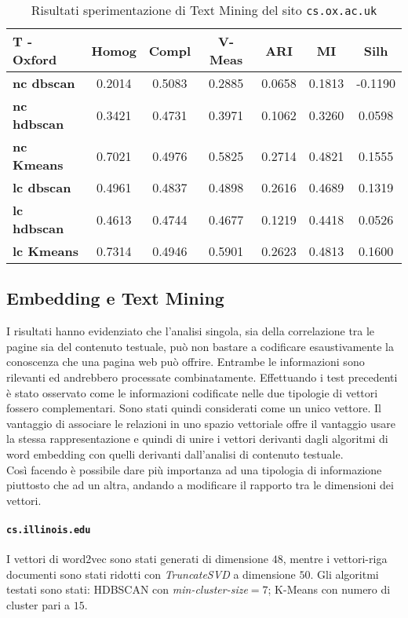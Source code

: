 \begin{table}[H]
	\begin{tabular}{| l | c | c | c | c | c | c |}
	\hline
	\textbf{T - Oxford}  & \textbf{Homog} & \textbf{Compl} & \textbf{V-Meas}  & \textbf{ARI}  & \textbf{MI}  & \textbf{Silh} \\ [3ex] \hline
	\textbf{nc dbscan} & 0.2014 & 0.5083 & 0.2885 & 0.0658 & 0.1813 & -0.1190 \\ [3ex]
	 \hline 
	\textbf{nc hdbscan} & 0.3421 & 0.4731 & 0.3971 & 0.1062 & 0.3260 & 0.0598 \\ [3ex]
	 \hline
	\textbf{nc Kmeans} & 0.7021 & 0.4976 & 0.5825 & 0.2714 & 0.4821 & 0.1555 \\ [3ex]
	 \hline	
	\textbf{lc dbscan} & 0.4961 & 0.4837 & 0.4898 & 0.2616 & 0.4689 & 0.1319 \\ [3ex]
	\hline
	\textbf{lc hdbscan} & 0.4613 & 0.4744 & 0.4677 & 0.1219 & 0.4418 & 0.0526 \\ [3ex]
	\hline
	\textbf{lc Kmeans} & 0.7314 & 0.4946 & 0.5901 & 0.2623 & 0.4813 & 0.1600 \\ [3ex]
	\hline
	\end{tabular}
	\caption{Risultati sperimentazione di Text Mining del sito \texttt{cs.ox.ac.uk}}
	\label{metricheTextOx}
\end{table}



\subsection{Embedding e Text Mining}
I risultati hanno evidenziato che l'analisi singola, sia della correlazione tra le pagine sia del contenuto testuale, può non bastare a codificare esaustivamente la conoscenza che una pagina web può offrire. Entrambe le informazioni sono rilevanti ed andrebbero processate combinatamente. Effettuando i test precedenti è stato osservato come le informazioni codificate nelle due tipologie di vettori fossero complementari. Sono stati quindi considerati come un unico vettore. Il vantaggio di associare le relazioni in uno spazio vettoriale offre il vantaggio usare la stessa rappresentazione e quindi di unire i vettori derivanti dagli algoritmi di word embedding con quelli derivanti dall'analisi di contenuto testuale. 
\\
Così facendo è possibile dare più importanza ad una tipologia di informazione piuttosto che ad un altra, andando a modificare il rapporto tra le dimensioni dei vettori.


\paragraph{\texttt{cs.illinois.edu}} I vettori di word2vec sono stati generati di dimensione $48$, mentre i vettori-riga documenti sono stati ridotti con \textit{TruncateSVD} a dimensione $50$. Gli algoritmi testati sono stati: HDBSCAN con \textit{min-cluster-size}$=7$; K-Means con numero di cluster pari a $15$. 


